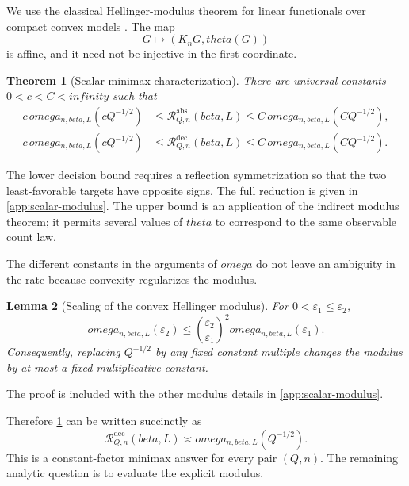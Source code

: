 \documentclass[11pt]{article}
\def\beta{beta}%
\def\theta{theta}%
\def\omega{omega}%
\def\infty{infinity}%
\newtheorem{theorem}{Theorem}[section]
\newtheorem{lemma}[theorem]{Lemma}
\newcommand{\calR}{\mathcal R}
\newcommand{\eps}{\varepsilon}
\begin{document}
We use the classical Hellinger-modulus theorem for linear functionals over compact convex models \citep{DonohoLiuII,JuditskyNemirovski}.  The map
\[
G\mapsto(K_nG,\theta(G))
\]
is affine, and it need not be injective in the first coordinate.

\begin{theorem}[Scalar minimax characterization]
\label{thm:scalar-modulus}
There are universal constants $0<c<C<\infty$ such that
\begin{align}
 c\,\omega_{n,\beta,L}(cQ^{-1/2})
&\le
\calR^{\mathrm{abs}}_{Q,n}(\beta,L)
\le
C\,\omega_{n,\beta,L}(CQ^{-1/2}),
\label{eq:abs-modulus}\\
 c\,\omega_{n,\beta,L}(cQ^{-1/2})
&\le
\calR^{\mathrm{dec}}_{Q,n}(\beta,L)
\le
C\,\omega_{n,\beta,L}(CQ^{-1/2}).
\label{eq:dec-modulus}
\end{align}
\end{theorem}

The lower decision bound requires a reflection symmetrization so that the two least-favorable targets have opposite signs.  The full reduction is given in \cref{app:scalar-modulus}.  The upper bound is an application of the indirect modulus theorem; it permits several values of $\theta$ to correspond to the same observable count law.

The different constants in the arguments of $\omega$ do not leave an ambiguity in the rate because convexity regularizes the modulus.

\begin{lemma}[Scaling of the convex Hellinger modulus]
\label{lem:modulus-scaling}
For $0<\eps_1\le\eps_2$,
\begin{equation}
\label{eq:modulus-scaling}
\omega_{n,\beta,L}(\eps_2)
\le
\left(\frac{\eps_2}{\eps_1}\right)^2
\omega_{n,\beta,L}(\eps_1).
\end{equation}
Consequently, replacing $Q^{-1/2}$ by any fixed constant multiple changes the modulus by at most a fixed multiplicative constant.
\end{lemma}
The proof is included with the other modulus details in \cref{app:scalar-modulus}.

Therefore \cref{thm:scalar-modulus} can be written succinctly as
\begin{equation}
\label{eq:scalar-modulus-succinct}
\boxed{
\calR^{\mathrm{dec}}_{Q,n}(\beta,L)
\asymp
\omega_{n,\beta,L}(Q^{-1/2}).
}
\end{equation}
This is a constant-factor minimax answer for every pair $(Q,n)$.  The remaining analytic question is to evaluate the explicit modulus.
\end{document}

